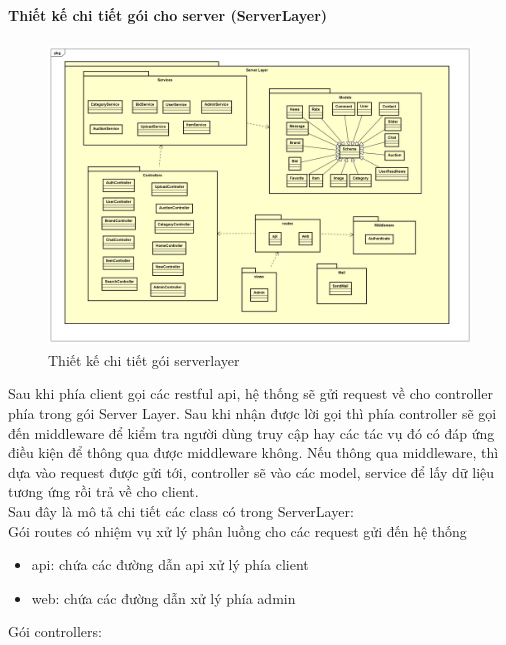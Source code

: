 \documentclass{article}
\begin{document}
\paragraph{Thiết kế chi tiết gói cho server (ServerLayer)}
\begin{figure}[H]
    \centering
    \includegraphics[width=11.4cm,height=8.0cm]{images/serverlayer.png}
    \caption{Thiết kế chi tiết gói serverlayer}
    \label{hinh45}
\end{figure}
Sau khi phía client gọi các restful api, hệ thống sẽ gửi request về cho controller phía trong gói Server Layer. Sau khi nhận được lời gọi thì phía controller sẽ gọi đến middleware để kiểm tra người dùng truy cập hay các tác vụ đó có đáp ứng điều kiện để thông qua được middleware không. Nếu thông qua middleware, thì dựa vào request được gửi tới, controller sẽ vào các model, service để lấy dữ liệu tương ứng rồi trả về cho client.\\ 
Sau đây là mô tả chi tiết các class có trong ServerLayer:\\
Gói routes có nhiệm vụ xử lý phân luồng cho các request gửi đến hệ thống
\begin{itemize}
    \item api: chứa các đường dẫn api xử lý phía client
    \item web: chứa các đường dẫn xử lý phía admin
\end{itemize}
Gói controllers:
\end{document}
